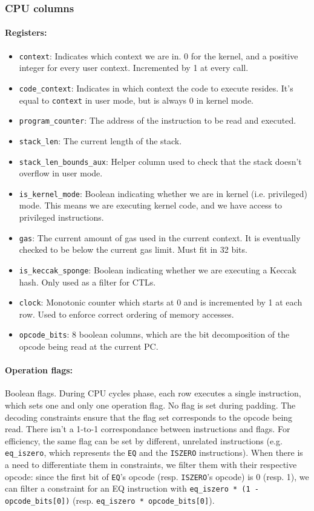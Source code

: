 \subsubsection{CPU columns}

\paragraph*{Registers:} \begin{itemize}
    \item \texttt{context}: Indicates which context we are in. 0 for the kernel, and a positive integer for every user context. Incremented by 1 at every call.
    \item \texttt{code\_context}: Indicates in which context the code to execute resides. It's equal to \texttt{context} in user mode, but is always 0 in kernel mode.
    \item \texttt{program\_counter}: The address of the instruction to be read and executed.
    \item \texttt{stack\_len}: The current length of the stack.
    \item \texttt{stack\_len\_bounds\_aux}: Helper column used to check that the stack doesn't overflow in user mode.
    \item \texttt{is\_kernel\_mode}: Boolean indicating whether we are in kernel (i.e. privileged) mode. This means we are executing kernel code, and we have access to
privileged instructions.
    \item \texttt{gas}: The current amount of gas used in the current context. It is eventually checked to be below the current gas limit. Must fit in 32 bits.
    \item \texttt{is\_keccak\_sponge}: Boolean indicating whether we are executing a Keccak hash. Only used as a filter for CTLs.
    \item \texttt{clock}: Monotonic counter which starts at 0 and is incremented by 1 at each row. Used to enforce correct ordering of memory accesses. 
    \item \texttt{opcode\_bits}: 8 boolean columns, which are the bit decomposition of the opcode being read at the current PC.
\end{itemize}

\paragraph*{Operation flags:} Boolean flags. During CPU cycles phase, each row executes a single instruction, which sets one and only one operation flag. No flag is set during
padding. The decoding constraints ensure that the flag set corresponds to the opcode being read.
There isn't a 1-to-1 correspondance between instructions and flags. For efficiency, the same flag can be set by different, unrelated instructions (e.g. \texttt{eq\_iszero}, which represents
the \texttt{EQ} and the \texttt{ISZERO} instructions). When there is a need to differentiate them in constraints, we filter them with their respective opcode: since the first bit of \texttt{EQ}'s opcode
(resp. \texttt{ISZERO}'s opcode) is 0 (resp. 1), we can filter a constraint for an EQ instruction with \texttt{eq\_iszero * (1 - opcode\_bits[0])}
(resp. \texttt{eq\_iszero * opcode\_bits[0]}).


